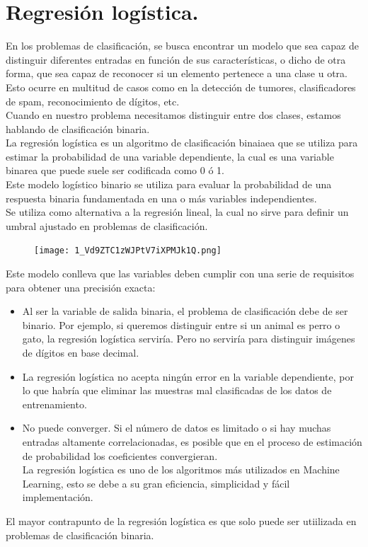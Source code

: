 \documentclass[a4paper,10pt]{article}
\begin{document}
\section{Regresión logística.}
En los problemas de clasificación, se busca encontrar un modelo que sea capaz de distinguir diferentes entradas en función de sus características, o dicho de otra forma, que sea capaz de reconocer si un elemento pertenece a una clase u otra. Esto ocurre en multitud de casos como en la detección de tumores, clasificadores de spam, reconocimiento de dígitos, etc. \\Cuando en nuestro problema necesitamos distinguir entre dos clases, estamos hablando de clasificación binaria.\\
La regresión logística es un algoritmo de clasificación binaiaea que se utiliza para estimar la probabilidad de una variable dependiente, la cual es una variable binarea que puede suele ser codificada como 0 ó 1.
\\Este modelo logístico binario se utiliza para evaluar la probabilidad de
una respuesta binaria fundamentada en una o más variables independientes. \\Se utiliza como alternativa a la regresión lineal, la cual no sirve para definir un umbral ajustado en problemas de clasificación.
\begin{figure}[H]
\centering
\texttt{[image: 1\_Vd9ZTC1zWJPtV7iXPMJk1Q.png]}
\end{figure}
Este modelo conlleva que las variables deben cumplir con una serie de requisitos para obtener una precisión exacta:
\begin{itemize}
\item Al ser la variable de salida binaria, el problema de clasificación debe de ser binario. Por ejemplo, si queremos distinguir entre si un animal es perro o gato, la regresión logística serviría. Pero no serviría para distinguir imágenes de dígitos en base decimal.
\item La regresión logística no acepta ningún error en la variable dependiente, por lo que habría que eliminar las muestras mal clasificadas de los datos de entrenamiento.
\item No puede converger. Si el número de datos es limitado o si
hay muchas entradas altamente correlacionadas, es posible que en el proceso de estimación de probabilidad los coeficientes convergieran.\\
La regresión logística es uno de los algoritmos más utilizados en Machine Learning, esto se debe a su gran eficiencia, simplicidad y fácil implementación.
\end{itemize}
 El mayor contrapunto de la regresión logística es que solo puede ser utiilizada en problemas de clasificación binaria.
\end{document}
